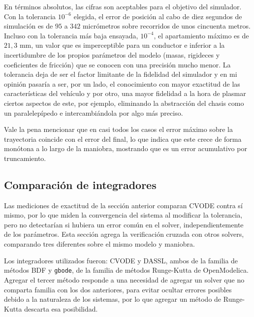 En términos absolutos, las cifras son aceptables para el objetivo del simulador. Con la tolerancia $10^{-6}$ elegida, el error de posición al cabo de diez segundos de simulación es de $95$ a $342$ micrómetros sobre recorridos de unos cincuenta metros. Incluso con la tolerancia más baja ensayada, $10^{-4}$, el apartamiento máximo es de $21{,}3$ mm, un valor que es imperceptible para un conductor e inferior a la incertidumbre de los propios parámetros del modelo (masas, rigideces y coeficientes de fricción) que se conocen con una precisión mucho menor. La tolerancia deja de ser el factor limitante de la fidelidad del simulador y en mi opinión pasaría a ser, por un lado, el conocimiento con mayor exactitud de las características del vehículo y por otro, una mayor fidelidad a la hora de plasmar ciertos aspectos de este, por ejemplo, eliminando la abstracción del chasis como un paralelepípedo e intercambiándola por algo más preciso.

Vale la pena mencionar que en casi todos los casos el error máximo sobre la trayectoria coincide con el error del final, lo que indica que este crece de forma monótona a lo largo de la maniobra, mostrando que es un error acumulativo por truncamiento.




\subsection{Comparación de integradores}

Las mediciones de exactitud de la sección anterior comparan CVODE contra sí mismo, por lo que miden la convergencia del sistema al modificar la tolerancia, pero no detectarían si hubiera un error común en el solver, independientemente de los parámetros. Esta sección agrega la verificación cruzada con otros solvers, comparando tres diferentes sobre el mismo modelo y maniobra.

Los integradores utilizados fueron: CVODE y DASSL, ambos de la familia de métodos BDF y \verb|gbode|, de la familia de métodos Runge-Kutta de OpenModelica. Agregar el tercer método responde a una necesidad de agregar un solver que no comparta familia con los dos anteriores, para evitar ocultar errores posibles debido a la naturaleza de los sistemas, por lo que agregar un método de Runge-Kutta descarta esa posibilidad. 


